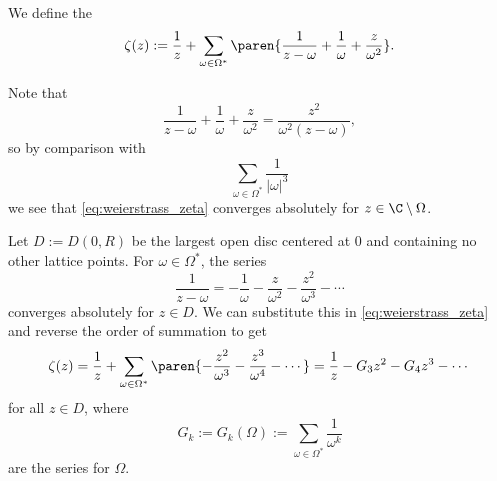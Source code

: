 \documentclass[11pt]{report}
\begin{document}
\begin{defn}
    We define the 
    \begin{align} \label{eq:weierstrass_zeta}
        \zeta(z) := \frac{1}{z}+\sum_{\omega \in \Omega^*}\paren{\frac{1}{z-\omega}+\frac{1}{\omega}+\frac{z}{\omega^2}}.
    \end{align}
\end{defn}
    Note that
    $$\frac{1}{z-\omega}+\frac{1}{\omega}+\frac{z}{\omega^2}=\frac{z^2}{\omega^2(z-\omega)},$$
    so by comparison with 
    $$\sum_{\omega \in \Omega^*}\frac{1}{|\omega|^3}$$
    we see that \eqref{eq:weierstrass_zeta} converges absolutely for $z \in \C \setminus \Omega$.

    Let $D:=D(0,R)$ be the largest open disc centered at $0$ and containing no other lattice points. For $\omega \in \Omega^*$, the series
    $$\frac{1}{z-\omega}=-\frac{1}{\omega}-\frac{z}{\omega^2}-\frac{z^2}{\omega^3}-\cdots$$
    converges absolutely for $z \in D$. We can substitute this in \eqref{eq:weierstrass_zeta} and reverse the order of summation to get
    $$\zeta(z) = \frac{1}{z} +\sum_{\omega \in \Omega^*}\paren{ -\frac{z^2}{\omega^3} - \frac{z^3}{\omega^4}-\cdots }= \frac{1}{z}-G_3z^2 - G_4z^3-\cdots $$
    for all $z \in D$, where
    $$G_k:=G_k(\Omega):= \sum_{\omega \in \Omega^*}\frac{1}{\omega^k}$$
    are the  series for $\Omega$.
\end{document}
